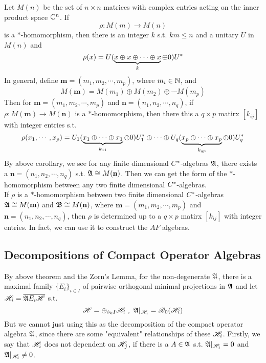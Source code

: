 \begin{exam}
	Let $M(n)$ be the set of $n \times n$ matrices with complex entries acting on the inner product space $\mathbb{C}^{n}$. If
	\begin{equation*}
		\rho \colon M(m) \longrightarrow M(n)
	\end{equation*}
	is a $*$-homomorphism, then there is an integer $k$ s.t. $km \leqslant n$ and a unitary $U$ in $M(n)$ and 
	\begin{equation*}
		\rho(x) = U(\underbrace{x \oplus x \oplus \cdots \oplus x}_k \oplus 0)U^{*}
	\end{equation*}
	In general, define $\mathbf{m} = (m_1, m_2, \cdots, m_p)$, where $m_i \in \mathbb{N}$, and
	\begin{equation*}
		M(\mathbf{m}) = M(m_1) \oplus M(m_2) \oplus \cdots M(m_p)
	\end{equation*}
	Then for $\mathbf{m} = (m_1, m_2, \cdots, m_p)$ and $\mathbf{n}=(n_1, n_2, \cdots, n_q)$, if $\rho \colon M(\mathbf{m}) \rightarrow M(\mathbf{n})$ is a $*$-homomorphism, then there this a $q \times p$ matirx $[k_{ij}]$ with integer entries s.t.
	\begin{equation*}
		\rho(x_1,\cdots,x_p) = U_1(\underbrace{x_1 \oplus \cdots \oplus x_1}_{k_{11}} \oplus 0)U^{*}_1 \oplus \cdots \oplus U_q(\underbrace{x_p \oplus \cdots \oplus x_p}_{k_{qp}} \oplus 0)U^{*}_q
	\end{equation*}
	By above corollary, we see for any finite dimensional $C^{*}$-algebras $\mathfrak{A}$, there exists a $\mathbf{n}=(n_1, n_2, \cdots, n_q)$ s.t. $\mathfrak{A} \cong M(\mathbf{n})$. Then we can get the form of the $*$-homomorphism between any two finite dimensional $C^{*}$-algebras. \\
	If $\rho$ is a $*$-homomorphism between two finite dimensional $C^{*}$-algebras\\ $\mathfrak{A} \cong M(\mathbf{m})$ and $\mathfrak{B} \cong M(\mathbf{n})$, where $\mathbf{m} = (m_1, m_2, \cdots, m_p)$ and $\mathbf{n}=(n_1, n_2, \cdots, n_q)$, then $\rho$ is determined up to a $q \times p$ matirx $[k_{ij}]$ with integer entries. In fact, we can use it to construct the $AF$ algebras.
\end{exam}

\subsection{Decompositions of Compact Operator Algebras}

By above theorem and the Zorn's Lemma, for the non-degenerate $\mathfrak{A}$, there is a maximal family $\{E_i\}_{i \in I}$ of pairwise orthogonal minimal projections in $\mathfrak{A}$ and let $\mathscr{H}_i = \overline{\mathfrak{A} E_i \mathscr{H}}$ s.t. 
\begin{equation*}
	\mathscr{H} = \oplus_{i \in I} \mathscr{H}_i~,~ \mathfrak{A}|_{\mathscr{H}_i} = \mathscr{B}_0(\mathscr{H}_i)
\end{equation*}
But we cannot just using this as the decomposition of the compact operator algebra $\mathfrak{A}$, since there are some "equivalent" relationships of these $\mathscr{H}_i$. Firstly, we say that $\mathscr{H}_i$ does not dependent on $\mathscr{H}_j$, if there is a $A \in \mathfrak{A}$ s.t. $\mathfrak{A}|_{\mathscr{H}_j} = 0$ and $\mathfrak{A}|_{\mathscr{H}_i} \neq 0$.

